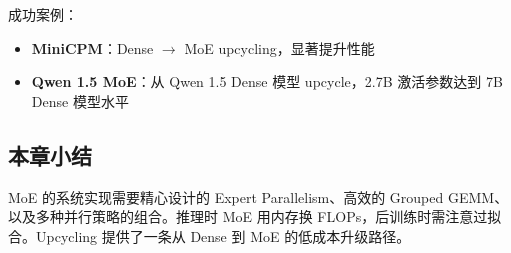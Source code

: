 成功案例：
\begin{itemize}
    \item \textbf{MiniCPM}：Dense $\rightarrow$ MoE upcycling，显著提升性能
    \item \textbf{Qwen 1.5 MoE}：从 Qwen 1.5 Dense 模型 upcycle，2.7B 激活参数达到 7B Dense 模型水平
\end{itemize}

\subsection{本章小结}

MoE 的系统实现需要精心设计的 Expert Parallelism、高效的 Grouped GEMM、以及多种并行策略的组合。推理时 MoE 用内存换 FLOPs，后训练时需注意过拟合。Upcycling 提供了一条从 Dense 到 MoE 的低成本升级路径。


